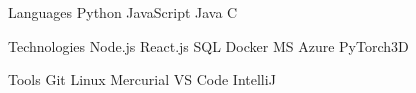 

\begin{cvskills}

  \cvskill
  {Languages} %
  {
    Python
      {\enskip\cdotp\enskip} JavaScript
      {\enskip\cdotp\enskip} Java
      {\enskip\cdotp\enskip} C
  } %

  \cvskill
  {Technologies} %
  {
    Node.js
      {\enskip\cdotp\enskip} React.js
      {\enskip\cdotp\enskip} SQL
      {\enskip\cdotp\enskip} Docker
      {\enskip\cdotp\enskip} MS Azure
      {\enskip\cdotp\enskip} PyTorch3D
  } %

  \cvskill
  {Tools} %
  {
    Git
      {\enskip\cdotp\enskip} Linux
      {\enskip\cdotp\enskip} Mercurial
      {\enskip\cdotp\enskip} VS Code
      {\enskip\cdotp\enskip} IntelliJ
  } %


\end{cvskills}

